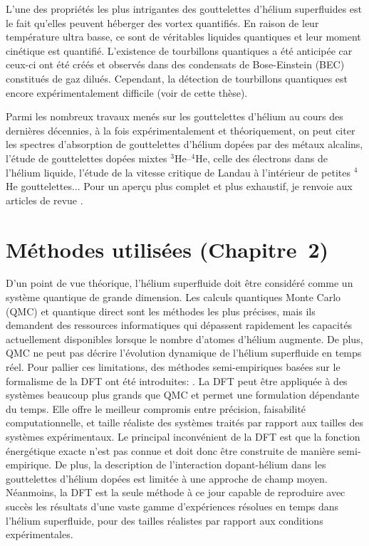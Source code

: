 		L'une des propriétés les plus intrigantes des gouttelettes d'hélium superfluides est le fait qu'elles peuvent héberger des vortex quantifiés. 
		En raison de leur température ultra basse, ce sont de véritables liquides quantiques et leur moment cinétique est quantifié. 
		L'existence de tourbillons quantiques a été anticipée car ceux-ci ont été créés et observés dans des condensats de Bose-Einstein (BEC) constitués de gaz dilués. 
		Cependant, la détection de tourbillons quantiques est encore expérimentalement difficile (voir  de cette thèse).

		Parmi les nombreux travaux menés sur les gouttelettes d'hélium au cours des dernières décennies, à la fois expérimentalement et théoriquement, on peut citer les spectres d'absorption de gouttelettes d'hélium dopées par des métaux alcalins, l'étude de gouttelettes dopées mixtes $^3$He--$^4$He, celle des électrons dans de l'hélium liquide, l'étude de la vitesse critique de Landau à l'intérieur de petites $^4$He gouttelettes...
		Pour un aperçu plus complet et plus exhaustif, je renvoie aux articles de revue .
	
	\section*{Méthodes utilisées \small{(Chapitre~2)}}
		D'un point de vue théorique, l'hélium superfluide doit être considéré comme un système quantique de grande dimension. 
		Les calculs quantiques Monte Carlo\citep{Kro02} (QMC) et quantique direct\citep{deL06,deL10,Agu13} sont les méthodes les plus précises, mais ils demandent des ressources informatiques qui dépassent rapidement les capacités actuellement disponibles lorsque le nombre d'atomes d'hélium augmente. 
		De plus, QMC ne peut pas décrire l'évolution dynamique de l'hélium superfluide en temps réel.
		 Pour pallier ces limitations, des méthodes semi-empiriques basées sur le formalisme de la DFT ont été introduites: \citep{Str87a,Str87b,Dal95}. 
		 La DFT peut être appliquée à des systèmes beaucoup plus grands que QMC et permet une formulation dépendante du temps. 
		 Elle offre le meilleur compromis entre précision, faisabilité computationnelle, et taille réaliste des systèmes traités par rapport aux tailles des systèmes expérimentaux. 
		 Le principal inconvénient de la DFT est que la fonction énergétique exacte n'est pas connue et doit donc être construite de manière semi-empirique. 
		 De plus, la description de l'interaction dopant-hélium dans les gouttelettes d'hélium dopées est limitée à une approche de champ moyen. 
		 Néanmoins, la DFT est la seule méthode à ce jour capable de reproduire avec succès les résultats d'une vaste gamme d'expériences résolues en temps dans l'hélium superfluide, pour des tailles réalistes par rapport aux conditions expérimentales.

